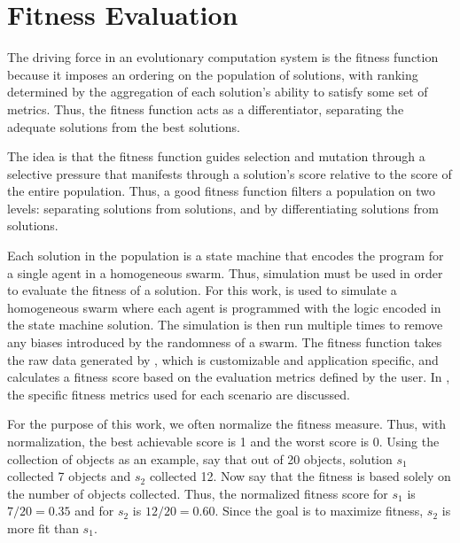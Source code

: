 \section{Fitness Evaluation}
\label{sec:fitness-function}

The driving force in an evolutionary computation system is the fitness function because it imposes an ordering on the population of solutions, with ranking determined by the aggregation of each solution's ability to satisfy some set of metrics.  Thus, the fitness function acts as a differentiator, separating the adequate solutions from the best solutions.

The idea is that the fitness function guides selection and mutation through a selective pressure that manifests through a solution's score relative to the score of the entire population.  Thus, a good fitness function filters a population on two levels: separating   solutions from  solutions, and by differentiating  solutions from  solutions.

Each solution in the population is a state machine that encodes the program for a single agent in a homogeneous swarm.  Thus, simulation must be used in order to evaluate the fitness of a solution.  For this work, \SWEEP is used to simulate a homogeneous swarm where each agent is programmed with the logic encoded in the state machine solution.  The simulation is then run multiple times to remove any biases introduced by the randomness of a swarm.  The fitness function takes the raw data generated by \SWEEP, which is customizable and application specific, and calculates a fitness score based on the evaluation metrics defined by the user.  In , the specific fitness metrics used for each scenario are discussed.  

For the purpose of this work, we often normalize the fitness measure.  Thus, with normalization, the best achievable score is 1 and the worst score is 0.  Using the collection of objects as an example, say that out of 20 objects, solution $s_1$ collected 7 objects and $s_2$ collected 12.  Now say that the fitness is based solely on the number of objects collected.  Thus, the normalized fitness score for $s_1$ is $7/20=0.35$ and for $s_2$ is $12/20=0.60$.  Since the goal is to maximize fitness, $s_2$ is more fit than $s_1$.
